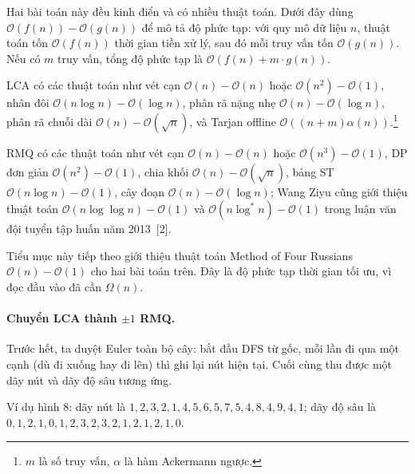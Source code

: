 \documentclass[11pt]{article}
\newcommand{\Oh}{\mathcal{O}}
\begin{document}
Hai bài toán này đều kinh điển và có nhiều thuật toán. Dưới đây dùng
\(\Oh(f(n))-\Oh(g(n))\) để mô tả độ phức tạp: với quy mô dữ liệu \(n\), thuật
toán tốn \(\Oh(f(n))\) thời gian tiền xử lý, sau đó mỗi truy vấn tốn
\(\Oh(g(n))\). Nếu có \(m\) truy vấn, tổng độ phức tạp là
\(\Oh(f(n)+m\cdot g(n))\).

LCA có các thuật toán như vét cạn \(\Oh(n)-\Oh(n)\) hoặc
\(\Oh(n^2)-\Oh(1)\), nhân đôi \(\Oh(n\log n)-\Oh(\log n)\), phân rã nặng nhẹ
\(\Oh(n)-\Oh(\log n)\), phân rã chuỗi dài \(\Oh(n)-\Oh(\sqrt n)\), và Tarjan
offline \(\Oh((n+m)\alpha(n))\).\footnote{\(m\) là số truy vấn, \(\alpha\) là
hàm Ackermann ngược.}

RMQ có các thuật toán như vét cạn \(\Oh(n)-\Oh(n)\) hoặc
\(\Oh(n^3)-\Oh(1)\), DP đơn giản \(\Oh(n^2)-\Oh(1)\), chia khối
\(\Oh(n)-\Oh(\sqrt n)\), bảng ST \(\Oh(n\log n)-\Oh(1)\), cây đoạn
\(\Oh(n)-\Oh(\log n)\); Wang Ziyu cũng giới thiệu thuật toán
\(\Oh(n\log\log n)-\Oh(1)\) và \(\Oh(n\log^* n)-\Oh(1)\) trong luận văn đội
tuyển tập huấn năm 2013~[2].

Tiểu mục này tiếp theo giới thiệu thuật toán Method of Four Russians
\(\Oh(n)-\Oh(1)\) cho hai bài toán trên. Đây là độ phức tạp thời gian tối ưu,
vì đọc đầu vào đã cần \(\Omega(n)\).

\paragraph{Chuyển LCA thành \(\pm1\) RMQ.}
Trước hết, ta duyệt Euler toàn bộ cây: bắt đầu DFS từ gốc, mỗi lần đi qua một
cạnh (dù đi xuống hay đi lên) thì ghi lại nút hiện tại. Cuối cùng thu được một
dãy nút và dãy độ sâu tương ứng.

\begin{center}

\small
Ví dụ hình 8: dãy nút là
\(1,2,3,2,1,4,5,6,5,7,5,4,8,4,9,4,1\); dãy độ sâu là
\(0,1,2,1,0,1,2,3,2,3,2,1,2,1,2,1,0\).
\end{center}
\end{document}
